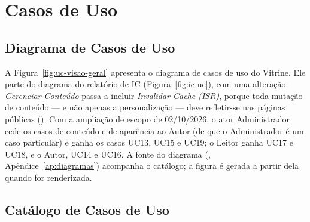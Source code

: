 \section{Casos de Uso}\label{sec:casos-uso}

\subsection{Diagrama de Casos de Uso}

A Figura~\ref{fig:uc-visao-geral} apresenta o diagrama de casos de uso do Vitrine. Ele parte do diagrama do relatório de IC (Figura~\ref{fig:ic-uc}), com uma alteração: \emph{Gerenciar Conteúdo} passa a incluir \emph{Invalidar Cache (ISR)}, porque toda mutação de conteúdo --- e não apenas a personalização --- deve refletir-se nas páginas públicas (). Com a ampliação de escopo de 02/10/2026, o ator Administrador cede os casos de conteúdo e de aparência ao Autor (de que o Administrador é um caso particular) e ganha os casos UC13, UC15 e UC19; o Leitor ganha UC17 e UC18, e o Autor, UC14 e UC16. A fonte do diagrama (, Apêndice~\ref{ap:diagramas}) acompanha o catálogo; a figura é gerada a partir dela quando for renderizada.



\subsection{Catálogo de Casos de Uso}


